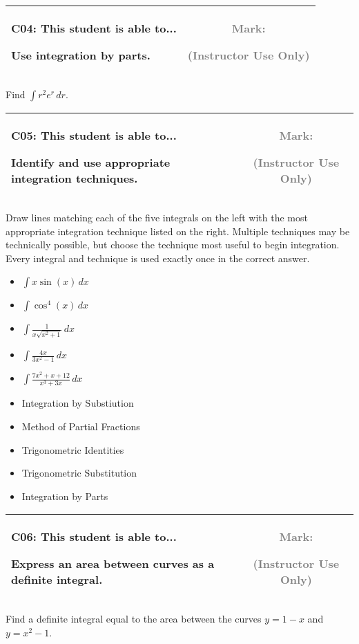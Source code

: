 \documentclass[12pt]{article}
\newcommand{\standardQuestion}[2]{
\newpage
\begin{center}
  \begin{tabular}{|l|c|}
  \hline
    \parbox{5in}{
      \textbf{#1}: This student is able to...\\
      #2
    }
  &
    \parbox{1in}{
      \vspace{0.1in}
      \footnotesize \textcolor{gray}{Mark:}
      \vspace{0.7in}

      \tiny \textcolor{gray}{(Instructor Use Only)}
    }
  \\\hline
  \end{tabular}
\end{center}
}
\begin{document}
\standardQuestion{C04}{
  Use integration by parts.
}

Find \(\int r^2e^r\,dr\).



\standardQuestion{C05}{
  Identify and use appropriate integration techniques.
}

Draw lines matching each of the five integrals on the left with
the most appropriate integration technique listed on the right.
Multiple techniques may be technically possible, but choose the technique most
useful to begin integration. Every integral and technique is used exactly
once in the correct answer.

\vspace{1em}

\begin{multicols}{2}
  \begin{itemize}
    \item[] \(\displaystyle\int x\sin(x)\,dx\)
    \item[] \(\displaystyle\int \cos^4(x)\,dx\)
    \item[] \(\displaystyle\int\frac{1}{x\sqrt{x^2+1}}\,dx\)
    \item[] \(\displaystyle\int\frac{4x}{3x^2-1}\,dx\)
    \item[] \(\displaystyle\int\frac{7x^2+x+12}{x^3+3x}\,dx\)
  \end{itemize}
  \columnbreak
  \begin{itemize}
    \item Integration by Substiution
    \item Method of Partial Fractions
    \item Trigonometric Identities
    \item Trigonometric Substitution
    \item Integration by Parts
  \end{itemize}
\end{multicols}



\standardQuestion{C06}{
  Express an area between curves as a definite integral.
}

Find a definite integral equal to the area between the curves
\(y=1-x\) and \(y=x^2-1\).




%
%
%
%
%
%
%
%
%
%
%
\end{document}
